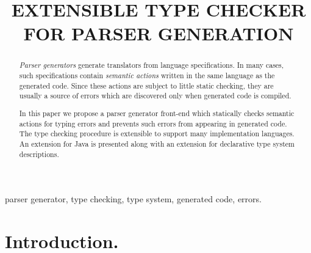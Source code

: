 \documentclass{informat} %
\begin{document}
%
\volume{}
\issue{}
\firstpage{}
\lastpage{}
\articletype{}   %
%
%
\begin{frontmatter}                           %
%
\title{EXTENSIBLE TYPE CHECKER\\ FOR PARSER GENERATION}
%
\author{ }
\address{Mathematics Department at Natural Science Faculty,\\
St. Petersburg State University of Information Technology, Mechanics and Optics\\
Kronverskiy~49, 195009, St.Petersburg, Russia\\
}
%
\begin{abstract}
	\emph{Parser generators} generate translators from language specifications. In many cases, such specifications contain \emph{semantic actions} written in the same language as the generated code. Since these actions are subject to little static checking, they are usually a source of errors which are discovered only when generated code is compiled.

	In this paper we propose a parser generator front-end which statically checks semantic actions for typing errors and prevents such errors from appearing in generated code. The type checking procedure is extensible to support many implementation languages. An extension for Java is presented along with an extension for declarative type system descriptions.
\end{abstract}
\begin{keyword}
parser generator, type checking, type system, generated code, errors.
\end{keyword}
\end{frontmatter}


\maketitle

\section{Introduction.}\label{Introduction}
\end{document}
